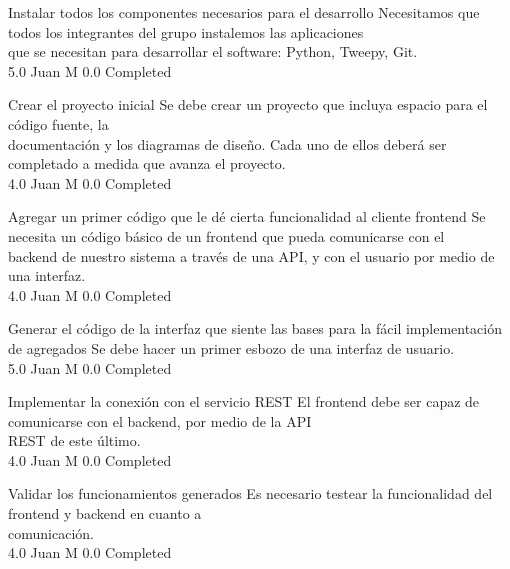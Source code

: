 		{Instalar todos los componentes necesarios para el desarrollo} %
		{Necesitamos que todos los integrantes del grupo instalemos las aplicaciones\\
que se necesitan para desarrollar el software: Python, Tweepy, Git.\\
} %
		{5.0} %
		{Juan M} %
		{0.0} %
		{Completed} %

		{Crear el proyecto inicial} %
		{Se debe crear un proyecto que incluya espacio para el código fuente, la\\
documentación y los diagramas de diseño. Cada uno de ellos deberá ser\\
completado a medida que avanza el proyecto.\\
} %
		{4.0} %
		{Juan M} %
		{0.0} %
		{Completed} %

		{Agregar un primer código que le dé cierta funcionalidad al cliente frontend} %
		{Se necesita un código básico de un frontend que pueda comunicarse con el\\
backend de nuestro sistema a través de una API, y con el usuario por medio de\\
una interfaz.\\
} %
		{4.0} %
		{Juan M} %
		{0.0} %
		{Completed} %

		{Generar el código de la interfaz que siente las bases para la fácil implementación de agregados} %
		{Se debe hacer un primer esbozo de una interfaz de usuario.\\
} %
		{5.0} %
		{Juan M} %
		{0.0} %
		{Completed} %

		{Implementar la conexión con el servicio REST} %
		{El frontend debe ser capaz de comunicarse con el backend, por medio de la API\\
REST de este último.\\
} %
		{4.0} %
		{Juan M} %
		{0.0} %
		{Completed} %

		{Validar los funcionamientos generados} %
		{Es necesario testear la funcionalidad del frontend y backend en cuanto a\\
comunicación.\\
} %
		{4.0} %
		{Juan M} %
		{0.0} %
		{Completed} %


